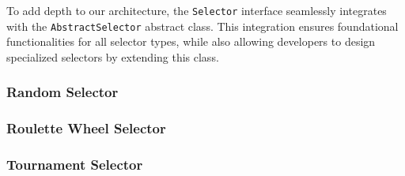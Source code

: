   \begin{remark}
    To add depth to our architecture, the \texttt{Selector} interface 
    seamlessly integrates with the \texttt{AbstractSelector} abstract class.
    This integration ensures foundational functionalities for all selector 
    types, while also allowing developers to design specialized selectors by 
    extending this class.
  \end{remark}

  \subsubsection{Random Selector}
  \label{sec:keen:operators:selection:random}
    \Blindtext
  \subsubsection{Roulette Wheel Selector}
  \label{sec:keen:operators:selection:roulette_wheel}
    \Blindtext
  \subsubsection{Tournament Selector}
  \label{sec:keen:operators:selection:tournament}
    \Blindtext
